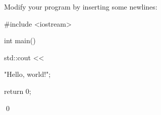 Modify your program by inserting some newlines:

\begin{console}

#include <iostream>



int main()

{

    std::cout << 









            "Hello, world!\n";



    return 0;

}

\end{console}

\qed

